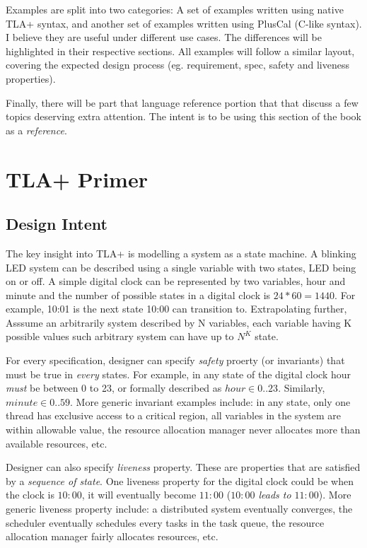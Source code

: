 \documentclass{report}
\begin{document}
Examples are split into two categories: A set of examples written using native
TLA+ syntax, and another set of examples written using PlusCal (C-like syntax).
I believe they are useful under different use cases. The differences will be
highlighted in their respective sections. All examples will follow a similar 
layout, covering the expected design process (eg. requirement, spec, safety and
liveness properties). \newline

Finally, there will be part that language reference portion that that discuss a
few topics deserving extra attention. The intent is to be using this section of the 
book as a \textit{reference}.

\chapter{TLA+ Primer}

\section{Design Intent}

The key insight into TLA+ is modelling a system as a state machine. A blinking
LED system can be described using a single variable with two states, LED being
on or off. A simple digital clock can be represented by two variables, hour and
minute and the number of possible states in a digital clock is $24 * 60 = 1440$.
For example, 10:01 is the next state 10:00 can transition to.  Extrapolating
further, Asssume an arbitrarily system described by N variables, each variable
having K possible values such arbitrary system can have up to $N^K$
state.\newline

For every specification, designer can specify \textit{safety} proerty (or
invariants) that must be true in \textit{every} states. For example, in any
state of the digital clock hour \textit{must} be between 0 to 23, or formally
described as $hour \in 0..23$.  Similarly, $minute \in 0..59$. More generic
invariant examples include: in any state, only one thread has exclusive access
to a critical region, all variables in the system are within allowable value,
the resource allocation manager never allocates more than available resources,
etc. \newline

Designer can also specify \textit{liveness} property. These are properties that
are satisfied by a \textit{sequence of state}. One liveness property for the
digital clock could be when the clock is $10:00$, it will eventually become
$11:00$ (\textit{$10:00$ leads to $11:00$}). More generic liveness property
include: a distributed system eventually converges, the scheduler eventually
schedules every tasks in the task queue, the resource allocation manager fairly
allocates resources, etc. \newline
\end{document}
